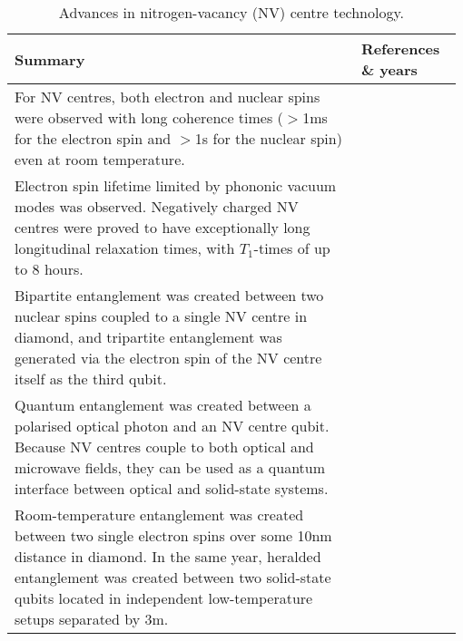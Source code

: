 \begin{table*}[!htbp]
	\begin{tabular}{|p{0.755\linewidth}|p{0.22\linewidth}|}
		\hline
	\textbf{Summary} & \textbf{References \& years} \\	\hline \hline
		For NV centres, both electron and nuclear spins were observed with long coherence times ($>$1ms for the electron spin and $>$1s for the nuclear spin) even at room temperature. &  \cite{bib:balasubramanian2009ultralong, bib:neumann2010quantum, bib:maurer2012room} \\
		\hline
		Electron spin lifetime limited by phononic vacuum modes was observed. Negatively charged NV centres were proved to have exceptionally long longitudinal relaxation times, with $T_1$-times \index{T$_1$-time} of up to 8 hours. & \cite{bib:astner2018solid} \\
		\hline
		Bipartite entanglement was created between two nuclear spins coupled to a single NV centre in diamond, and tripartite entanglement was generated via the electron spin of the NV centre itself as the third qubit. & \cite{bib:neumann2008multipartite} \\
		\hline
		Quantum entanglement was created between a polarised optical photon and an NV centre qubit. Because NV centres couple to both optical and microwave fields, they can be used as a quantum interface between optical and solid-state systems.  & \cite{bib:togan2010quantum}\\
		\hline
		Room-temperature entanglement was created between two single electron spins over some 10nm distance in diamond. In the same year, heralded entanglement was created between two solid-state qubits located in independent low-temperature setups separated by 3m. & \cite{bib:dolde2013room, bib:bernien2013heralded} \\
		\hline
	\end{tabular}
	\captionspacetab \caption{Advances in nitrogen-vacancy (NV) centre technology.} \label{tab:NV_centres}
\end{table*}

